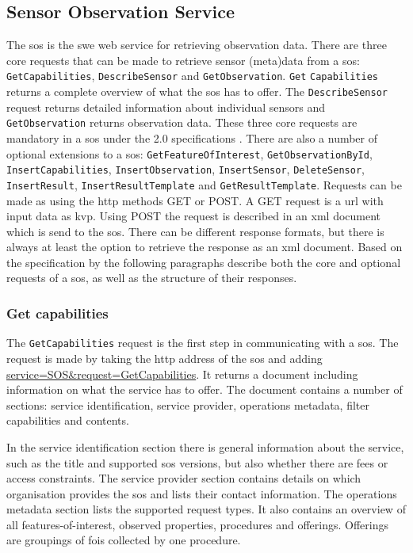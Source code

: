 \subsection{Sensor Observation Service}
\label{par:sos}
\begin{sloppypar}
	The \acf{sos} is the \ac{swe} web service for retrieving observation data. There are three core requests that can be made to retrieve sensor (meta)data from a \ac{sos}: \texttt{GetCapabilities}, \texttt{DescribeSensor} and \texttt{GetObservation}. \texttt{Get} \texttt{Capabilities} returns a complete overview of what the \ac{sos} has to offer. The \texttt{DescribeSensor} request returns detailed information about individual sensors and \texttt{GetObservation} returns observation data. These three core requests are mandatory in a \ac{sos} under the 2.0 specifications \citep{SW:OGC2}. There are also a number of optional extensions to a \ac{sos}: \texttt{GetFeatureOfInterest}, \texttt{GetObservationById}, \texttt{InsertCapabilities}, \texttt{InsertObservation}, \texttt{InsertSensor}, \texttt{DeleteSensor}, \texttt{InsertResult}, \texttt{InsertResultTemplate} and \texttt{GetResultTemplate}. Requests can be made as using the \acf{http} methods GET or POST. A GET request is a \ac{url} with input data as \acf{kvp}. Using POST the request is described in an \ac{xml} document which is send to the \ac{sos}. There can be different response formats, but there is always at least the option to retrieve the response as an \ac{xml} document. Based on the specification by \cite{SW:OGC2} the following paragraphs describe both the core and optional requests of a \ac{sos}, as well as the structure of their responses. 
\end{sloppypar}

\subsubsection{Get capabilities}
\label{par:capabilities}
The \texttt{GetCapabilities} request is the first step in communicating with a \ac{sos}. The request is made by taking the \ac{http} address of the \ac{sos} and adding \url{service=SOS\&request=GetCapabilities}. It returns a document including information on what the service has to offer. The document contains a number of sections: service identification, service provider, operations metadata, filter capabilities and contents. 

In the service identification section there is general information about the service, such as the title and supported \ac{sos} versions, but also whether there are fees or access constraints. The service provider section contains details on which organisation provides the \ac{sos} and lists their contact information. The operations metadata section lists the supported request types. It also contains an overview of all features-of-interest, observed properties, procedures and offerings. Offerings are groupings of \acp{foi} collected by one procedure.

